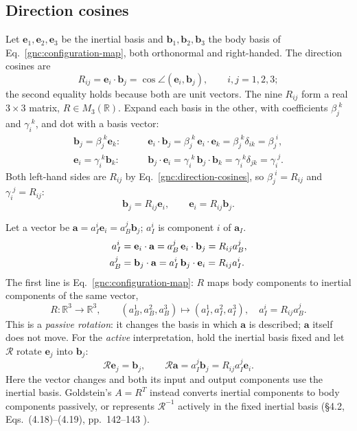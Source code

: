 \subsection{Direction cosines}\label{gnc:sec:direction-cosines}
Let $\mathbf e_1,\mathbf e_2,\mathbf e_3$ be the inertial basis and
$\mathbf b_1,\mathbf b_2,\mathbf b_3$ the body basis of
Eq.~\eqref{gnc:configuration-map}, both orthonormal and right-handed.
The direction cosines are
\begin{equation}\label{gnc:direction-cosines}
 R_{ij}=\mathbf e_i\cdot\mathbf b_j
 =\cos\angle(\mathbf e_i,\mathbf b_j),\qquad i,j=1,2,3;
\end{equation}
the second equality holds because both are unit vectors. The nine
$R_{ij}$ form a real $3\times3$ matrix, $R\in M_3(\mathbb R)$.
Expand each basis in the other, with coefficients $\beta_j^{\,\,k}$ and
$\gamma_i^{\,\,k}$, and dot with a basis vector:
\begin{align*}
 \mathbf b_j=\beta_j^{\,\,k}\mathbf e_k:&\qquad
 \mathbf e_i\cdot\mathbf b_j
 =\beta_j^{\,\,k}\,\mathbf e_i\cdot\mathbf e_k
 =\beta_j^{\,\,k}\delta_{ik}=\beta_j^{\,\,i},\\
 \mathbf e_i=\gamma_i^{\,\,k}\mathbf b_k:&\qquad
 \mathbf b_j\cdot\mathbf e_i
 =\gamma_i^{\,\,k}\,\mathbf b_j\cdot\mathbf b_k
 =\gamma_i^{\,\,k}\delta_{jk}=\gamma_i^{\,\,j}.
\end{align*}
Both left-hand sides are $R_{ij}$ by Eq.~\eqref{gnc:direction-cosines},
so $\beta_j^{\,\,i}=R_{ij}$ and $\gamma_i^{\,\,j}=R_{ij}$:
\begin{equation}\label{gnc:dcm-basis}
 \mathbf b_j=R_{ij}\mathbf e_i,\qquad
 \mathbf e_i=R_{ij}\mathbf b_j .
\end{equation}

Let a vector be $\mathbf a=a_I^i\mathbf e_i=a_B^j\mathbf b_j$;
$a_I^i$ is component $i$ of $\mathbf a_I$.
\begin{align}
 a_I^i&=\mathbf e_i\cdot\mathbf a
  =a_B^j\,\mathbf e_i\cdot\mathbf b_j=R_{ij}a_B^j,\notag\\
 a_B^j&=\mathbf b_j\cdot\mathbf a
  =a_I^i\,\mathbf b_j\cdot\mathbf e_i=R_{ij}a_I^i.
  \label{gnc:dcm-components}
\end{align}
The first line is Eq.~\eqref{gnc:configuration-map}: $R$ maps body
components to inertial components of the same vector,
\[
 R\colon\mathbb R^3\to\mathbb R^3,\qquad
 (a_B^1,a_B^2,a_B^3)\mapsto(a_I^1,a_I^2,a_I^3),\quad
 a_I^i=R_{ij}a_B^j .
\]
This is a \emph{passive rotation}: it changes the basis in which
$\mathbf a$ is described; $\mathbf a$ itself does not move.
For the \emph{active} interpretation, hold the inertial basis fixed and
let $\mathcal R$ rotate $\mathbf e_j$ into $\mathbf b_j$:
\begin{equation}\label{gnc:dcm-active}
 \mathcal R\mathbf e_j=\mathbf b_j,\qquad
 \mathcal R\mathbf a=a_I^j\mathbf b_j
 =R_{ij}a_I^j\mathbf e_i .
\end{equation}
Here the vector changes and both its input and output components use the
inertial basis. Goldstein's $A=R^T$ instead converts inertial components
to body components passively, or represents $\mathcal R^{-1}$ actively
in the fixed inertial basis (\S4.2, Eqs.~(4.18)--(4.19), pp.~142--143
\cite{dgdt:GPS2001}).

